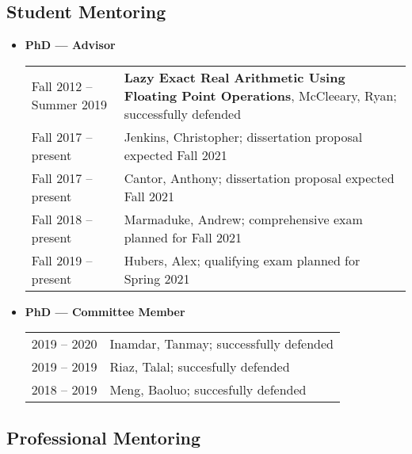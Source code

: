 \documentclass[10pt]{article}
\begin{document}
\begin{IOWA ONLY}
\subsection*{Student Mentoring}
\smallskip

\begin{itemize}

\item[] \textbf{PhD --- Advisor}
\\[1.3ex]
\begin{tabular}{l@{\quad\ }p{30em}} 
 Fall 2012 -- Summer 2019
 & {\bf Lazy Exact Real Arithmetic Using Floating Point Operations}, McCleeary, Ryan; successfully defended
 \\[.5ex]
 Fall 2017 -- present
 & Jenkins, Christopher; dissertation proposal expected Fall 2021
 \\[.5ex]
 Fall 2017 -- present
 & Cantor, Anthony; dissertation proposal expected Fall 2021
 \\[.5ex]
 Fall 2018 -- present
 & Marmaduke, Andrew; comprehensive exam planned for Fall 2021
 \\[.5ex]
 Fall 2019 -- present
 & Hubers, Alex; qualifying exam planned for Spring 2021
 \\[.5ex]
\end{tabular}


\item[] \textbf{PhD --- Committee Member}
\\[1.3ex]
\begin{tabular}{l@{\quad\ }p{30em}} 
 2019 -- 2020
 & Inamdar, Tanmay; successfully defended
 \\[.5ex]
 2019 -- 2019
 & Riaz, Talal; succesfully defended
 \\[.5ex]
 2018 -- 2019
 & Meng, Baoluo; succesfully defended
 \\[.5ex]
\end{tabular}

\end{itemize}

\pagebreak
\subsection*{Professional Mentoring}
\smallskip


\end{IOWA ONLY}
\end{document}
